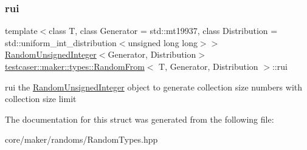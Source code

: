\subsubsection{\texorpdfstring{rui}{rui}}
{\footnotesize\ttfamily template$<$class T, class Generator = std\+::mt19937, class Distribution = std\+::uniform\+\_\+int\+\_\+distribution$<$unsigned long long$>$$>$ \\
\mbox{\hyperlink{classtestcaser_1_1maker_1_1types_1_1RandomUnsignedInteger}{Random\+Unsigned\+Integer}}$<$Generator, Distribution$>$ \mbox{\hyperlink{structtestcaser_1_1maker_1_1types_1_1RandomFrom}{testcaser\+::maker\+::types\+::\+Random\+From}}$<$ T, Generator, Distribution $>$\+::rui}



rui the \mbox{\hyperlink{classtestcaser_1_1maker_1_1types_1_1RandomUnsignedInteger}{Random\+Unsigned\+Integer}} object to generate collection size numbers with collection size limit 



The documentation for this struct was generated from the following file\+:\begin{DoxyCompactItemize}
\item 
core/maker/randoms/Random\+Types.\+hpp\end{DoxyCompactItemize}
